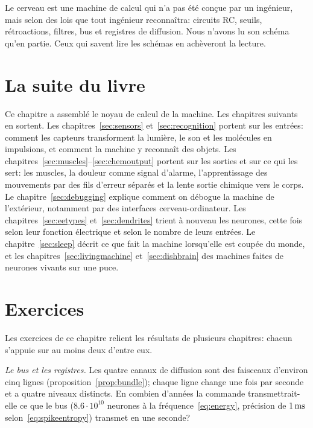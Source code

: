 Le cerveau est une machine de calcul qui n'a pas été conçue par un ingénieur, mais selon des lois que tout ingénieur reconnaîtra: circuits RC, seuils, rétroactions, filtres, bus et registres de diffusion. Nous n'avons lu son schéma qu'en partie. Ceux qui savent lire les schémas en achèveront la lecture.

\section{La suite du livre}

Ce chapitre a assemblé le noyau de calcul de la machine. Les chapitres suivants en sortent. Les chapitres~\ref{sec:sensors} et~\ref{sec:recognition} portent sur les entrées: comment les capteurs transforment la lumière, le son et les molécules en impulsions, et comment la machine y reconnaît des objets. Les chapitres~\ref{sec:muscles}--\ref{sec:chemoutput} portent sur les sorties et sur ce qui les sert: les muscles, la douleur comme signal d'alarme, l'apprentissage des mouvements par des fils d'erreur séparés et la lente sortie chimique vers le corps. Le chapitre~\ref{sec:debugging} explique comment on débogue la machine de l'extérieur, notamment par des interfaces cerveau-ordinateur. Les chapitres~\ref{sec:eetypes} et~\ref{sec:dendrites} trient à nouveau les neurones, cette fois selon leur fonction électrique et selon le nombre de leurs entrées. Le chapitre~\ref{sec:sleep} décrit ce que fait la machine lorsqu'elle est coupée du monde, et les chapitres~\ref{sec:livingmachine} et~\ref{sec:dishbrain} des machines faites de neurones vivants sur une puce.

\section{Exercices}

Les exercices de ce chapitre relient les résultats de plusieurs chapitres: chacun s'appuie sur au moins deux d'entre eux.

\begin{exercise}[\lvlA]
\label{ex:10:1}
\emph{Le bus et les registres.} Les quatre canaux de diffusion sont des faisceaux d'environ cinq lignes (proposition~\ref{prop:bundle}); chaque ligne change une fois par seconde et a quatre niveaux distincts. En combien d'années la commande transmettrait-elle ce que le bus  ($8.6\cdot10^{10}$ neurones à la fréquence~\eqref{eq:energy}, précision de $1\,\text{ms}$ selon~\eqref{eq:spikeentropy}) transmet en une seconde?
\end{exercise}

